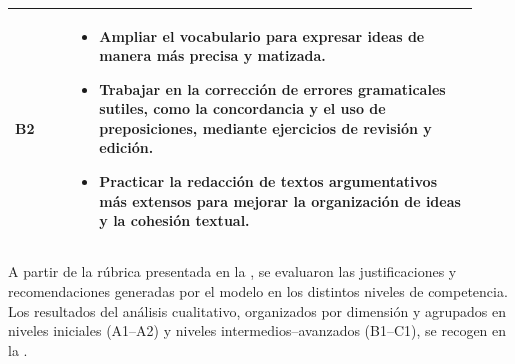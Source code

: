 \documentclass[spanish]{textolivre}
\begin{document}
\begin{table}[h!]
\begin{tabular}{>{\raggedright\arraybackslash}p{0.12\linewidth}>{\raggedright\arraybackslash}p{0.80\linewidth}}
        B2 &
        \begin{itemize}
            \item Ampliar el vocabulario para expresar ideas de manera más precisa y matizada.
            \item Trabajar en la corrección de errores gramaticales sutiles, como la concordancia y el uso de preposiciones, mediante ejercicios de revisión y edición.
            \item Practicar la redacción de textos argumentativos más extensos para mejorar la organización de ideas y la cohesión textual.
        \end{itemize}
        \\
        \bottomrule
    \end{tabular}
\end{table}

A partir de la rúbrica presentada en la , se evaluaron las justificaciones y recomendaciones generadas por el modelo en los distintos niveles de competencia. Los resultados del análisis cualitativo, organizados por dimensión y agrupados en niveles iniciales (A1–A2) y niveles intermedios–avanzados (B1–C1), se recogen en la .
\end{document}
